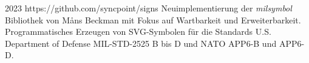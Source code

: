 \cventry
{2023}
{https://github.com/syncpoint/signs}
{}
{}
{}
{
  Neuimplementierung der \emph{milsymbol} Bibliothek von Måns Beckman mit Fokus auf
  Wartbarkeit und Erweiterbarkeit. Programmatisches Erzeugen von SVG-Symbolen für die
  Standards U.S. Department of Defense MIL-STD-2525 B bis D und NATO APP6-B und APP6-D.
}
